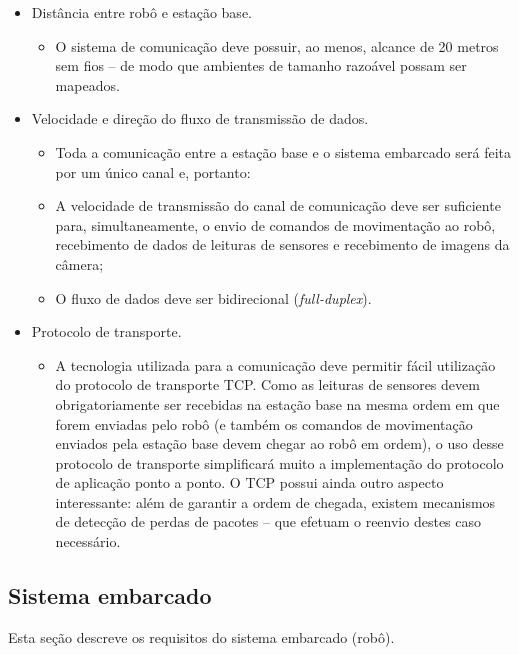 \begin{itemize} %

  \item Distância entre robô e estação base.
    \begin{itemize}
      \item O sistema de comunicação deve possuir, ao menos, alcance de 20 metros sem fios -- de modo que ambientes de tamanho razoável possam ser mapeados.
    \end{itemize}

  \item Velocidade e direção do fluxo de transmissão de dados.
    \begin{itemize}
      \item Toda a comunicação entre a estação base e o sistema embarcado será feita por um único canal e, portanto:
      \item A velocidade de transmissão do canal de comunicação deve ser suficiente para, simultaneamente, o envio de comandos de movimentação ao robô, recebimento de dados de leituras de sensores e recebimento de imagens da câmera; 
      \item O fluxo de dados deve ser bidirecional (\textit{full-duplex}).
    \end{itemize}

  \item Protocolo de transporte.
    \begin{itemize}
      \item A tecnologia utilizada para a comunicação deve permitir fácil utilização do protocolo de transporte TCP. Como as leituras de sensores devem obrigatoriamente ser recebidas na estação base na mesma ordem em que forem enviadas pelo robô (e também os comandos de movimentação enviados pela estação base devem chegar ao robô em ordem), o uso desse protocolo de transporte simplificará muito a implementação do protocolo de aplicação ponto a ponto. O TCP possui ainda outro aspecto interessante: além de garantir a ordem de chegada, existem mecanismos de detecção de perdas de pacotes -- que efetuam o reenvio destes caso necessário.
    \end{itemize}

\end{itemize} %



\subsection{Sistema embarcado}
\label{subsec:req_sistema-embarcado}
Esta seção descreve os requisitos do sistema embarcado (robô).

